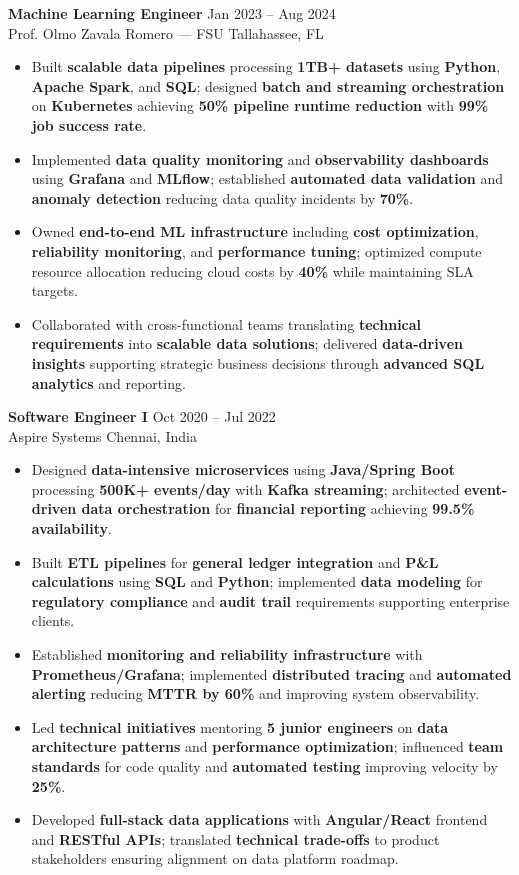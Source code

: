 \documentclass[letterpaper,10pt]{article}
\newcommand{\resumeItem}[1]{\item\small #1}
\newcommand{\resumeSubheading}[4]{
  \vspace{6pt}
  \noindent
  \textbf{#1} \hfill {\footnotesize #2} \\
  [-1pt]
  \noindent
  \small #3 \hfill {\small #4}
  \vspace{3pt}
}
\newcommand{\resumeItemsStart}{\vspace{-2pt}\begin{itemize}}
\newcommand{\resumeItemsEnd}{\end{itemize}\vspace{6pt}}
\begin{document}
\resumeSubheading
{Machine Learning Engineer}{Jan 2023 -- Aug 2024}
{Prof. Olmo Zavala Romero — FSU}{Tallahassee, FL}
\resumeItemsStart
\resumeItem{Built \textbf{scalable data pipelines} processing \textbf{1TB+ datasets} using \textbf{Python}, \textbf{Apache Spark}, and \textbf{SQL}; designed \textbf{batch and streaming orchestration} on \textbf{Kubernetes} achieving \textbf{50\% pipeline runtime reduction} with \textbf{99\% job success rate}.}
\resumeItem{Implemented \textbf{data quality monitoring} and \textbf{observability dashboards} using \textbf{Grafana} and \textbf{MLflow}; established \textbf{automated data validation} and \textbf{anomaly detection} reducing data quality incidents by \textbf{70\%}.}
\resumeItem{Owned \textbf{end-to-end ML infrastructure} including \textbf{cost optimization}, \textbf{reliability monitoring}, and \textbf{performance tuning}; optimized compute resource allocation reducing cloud costs by \textbf{40\%} while maintaining SLA targets.}
\resumeItem{Collaborated with cross-functional teams translating \textbf{technical requirements} into \textbf{scalable data solutions}; delivered \textbf{data-driven insights} supporting strategic business decisions through \textbf{advanced SQL analytics} and reporting.}
\resumeItemsEnd
\vspace{-12pt}

\resumeSubheading
{Software Engineer I}{Oct 2020 -- Jul 2022}
{Aspire Systems}{Chennai, India}
\resumeItemsStart
\resumeItem{Designed \textbf{data-intensive microservices} using \textbf{Java/Spring Boot} processing \textbf{500K+ events/day} with \textbf{Kafka streaming}; architected \textbf{event-driven data orchestration} for \textbf{financial reporting} achieving \textbf{99.5\% availability}.}
\resumeItem{Built \textbf{ETL pipelines} for \textbf{general ledger integration} and \textbf{P\&L calculations} using \textbf{SQL} and \textbf{Python}; implemented \textbf{data modeling} for \textbf{regulatory compliance} and \textbf{audit trail} requirements supporting enterprise clients.}
\resumeItem{Established \textbf{monitoring and reliability infrastructure} with \textbf{Prometheus/Grafana}; implemented \textbf{distributed tracing} and \textbf{automated alerting} reducing \textbf{MTTR by 60\%} and improving system observability.}
\resumeItem{Led \textbf{technical initiatives} mentoring \textbf{5 junior engineers} on \textbf{data architecture patterns} and \textbf{performance optimization}; influenced \textbf{team standards} for code quality and \textbf{automated testing} improving velocity by \textbf{25\%}.}
\resumeItem{Developed \textbf{full-stack data applications} with \textbf{Angular/React} frontend and \textbf{RESTful APIs}; translated \textbf{technical trade-offs} to product stakeholders ensuring alignment on data platform roadmap.}
\resumeItemsEnd
\vspace{-12pt}
\end{document}
